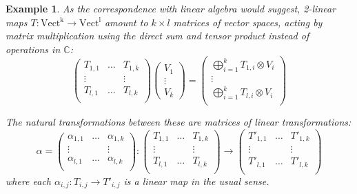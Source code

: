 \documentclass[10pt]{amsart}
\numberwithin{theorem}{subsection}
\newtheorem{varexample}[theorem]{Example}
\newenvironment{example}{\begin{varexample}\em}{\em\end{varexample}}
\newcommand{\ra}{\mathop{\rightarrow}}
\newcommand{\opname}[1]{\operatorname{#1}}
\newcommand{\catname}[1]{\boldsymbol{\opname{{#1}}}}
\begin{document}
\begin{example}
As the correspondence with linear algebra would suggest, 2-linear maps
$T: \catname{Vect^k} \ra\catname{Vect^l}$ amount to $k \times l$
matrices of vector spaces, acting by matrix multiplication using the
direct sum and tensor product instead of operations in $\mathbb{C}$:
\begin{equation}\label{eq:kv2linmatrix}
\begin{pmatrix}
T_{1,1} & \dots & T_{1,k} \\
\vdots & & \vdots \\
T_{l,1} & \dots & T_{l,k} \\
\end{pmatrix}
\begin{pmatrix}
  V_1 \\ 
  \vdots \\
  V_k
\end{pmatrix}
=
\begin{pmatrix}
  \bigoplus_{i=1}^k T_{1,i} \otimes V_i \\ 
  \vdots \\
  \bigoplus_{i=1}^k T_{l,i} \otimes V_i \\ 
\end{pmatrix}
\end{equation}

The natural transformations between these are matrices of linear
transformations:
\begin{equation}\label{eq:kvnattransmatrix}
\alpha = \begin{pmatrix}
\alpha_{1,1} & \dots & \alpha_{1,k} \\
\vdots & & \vdots \\
\alpha_{l,1} & \dots & \alpha_{l,k} \\
\end{pmatrix}
:
\begin{pmatrix}
T_{1,1} & \dots & T_{1,k} \\
\vdots & & \vdots \\
T_{l,1} & \dots & T_{l,k} \\
\end{pmatrix}
\longrightarrow
\begin{pmatrix}
T'_{1,1} & \dots & T'_{1,k} \\
\vdots & & \vdots \\
T'_{l,1} & \dots & T'_{l,k} \\
\end{pmatrix}
\end{equation}
where each $\alpha_{i,j} : T_{i,j} \ra T'_{i,j}$ is a linear
map in the usual sense.


\end{example}
\end{document}
